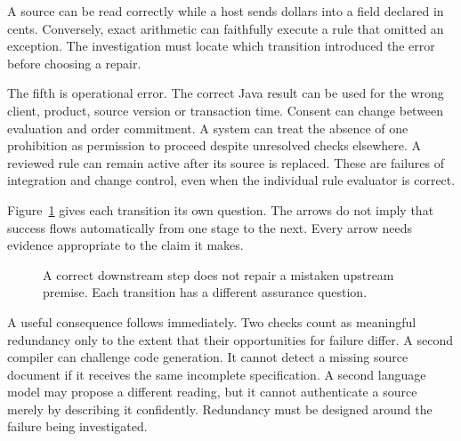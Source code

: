 \documentclass[12pt,a4paper,oneside,openany]{book}
\begin{document}
A source can be read correctly while a host sends dollars into a field declared in cents. Conversely, exact arithmetic can faithfully execute a rule that omitted an exception. The investigation must locate which transition introduced the error before choosing a repair.


The fifth is operational error. The correct Java result can be used for the
wrong client, product, source version or transaction time. Consent can change
between evaluation and order commitment. A system can treat the absence of one
prohibition as permission to proceed despite unresolved checks elsewhere. A
reviewed rule can remain active after its source is replaced. These are failures
of integration and change control, even when the individual rule evaluator is
correct.

Figure~\ref{fig:assurance-chain} gives each transition its own question. The
arrows do not imply that success flows automatically from one stage to the next. Every
arrow needs evidence appropriate to the claim it makes.

\begin{figure}[htbp]
\centering
{}
\caption{A correct downstream step does not repair a mistaken upstream premise.
Each transition has a different assurance question.}
\label{fig:assurance-chain}
\end{figure}

A useful consequence follows immediately. Two checks count as meaningful
redundancy only to the extent that their opportunities for failure differ. A
second compiler can challenge code generation. It cannot detect a missing source
document if it receives the same incomplete specification. A second language
model may propose a different reading, but it cannot authenticate a source merely
by describing it confidently. Redundancy must be designed around the failure
being investigated.
\end{document}
